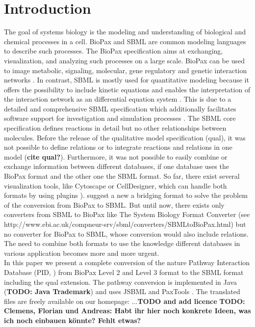 \documentclass{bioinfo}
\begin{document}
\section{Introduction}
The goal of systems biology is the modeling and understanding of biological and chemical processes in a cell. 
BioPax and SBML are common modeling languages to describe such processes. 
The BioPax specification aims at exchanging, visualization, and analyzing such processes on a large scale. 
BioPax can be used to image metabolic, signaling, molecular, gene regulatory and genetic interaction networks \citep{Demir2010}. 
In contrast, SBML is mostly used for quantitative modeling because it offers the possibility to include kinetic equations and enables the interpretation of the interaction network as an differential equation system \citep{Hucka2003}. 
This is due to a detailed and comprehensive SBML specification which additionally facilitates software support for investigation and simulation processes \citep{Draeger2008}. 
The SBML core specification defines reactions in detail but no other relationships between molecules.
Before the release of the qualitative model specification (qual), it was not possible to define relations or to integrate reactions and relations in one model (\textbf{cite qual?}).
Furthermore, it was not possible to easily combine or exchange information between different databases, if one database uses the BioPax format and the other one the SBML format.
So far, there exist several visualization tools, like Cytoscape or CellDesigner, which can handle both formats by using plugins \citep{Mi2011, Draeger2008, Funahashi2007, Smoot2011a, Zinovyev2008}). 
\citet*{Ruebenacker2009} suggest a new a bridging format to solve the problem of the conversion from BioPax to SBML. 
But until now, there exists only converters from SBML to BioPax like The System Biology Format Converter (see http://www.ebi.ac.uk/compneur-srv/sbml/converters/SBMLtoBioPax.html) but no converter for BioPax to SBML, whose conversion would also include relations. 
The need to combine both formats to use the knowledge different databases in various application becomes more and more urgent.\\
In this paper we present a complete conversion of the nature Pathway Interaction Database (PID, \citet{Schaefer2009}) from BioPax Level 2 and Level 3 format to the SBML format including the qual extension. 
The pathway conversion is implemented in Java (\textbf{TODO: Java Trademark}) and uses JSBML \citep{Draeger2011} and PaxTools \citep{Demir2010}. 
The translated files are freely available on our homepage: ...\textbf{TODO and add licence}
\textbf{TODO: Clemens, Florian und Andreas: Habt ihr hier noch konkrete Ideen, was ich noch einbauen k\"onnte? Fehlt etwas?}
\end{document}

